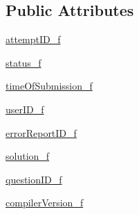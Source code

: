 \subsection*{Public Attributes}
\begin{DoxyCompactItemize}
\item 
\hyperlink{class_ecodena_1_1_attempt_1_1models_1_1_attempt_a5868c5092dc59689fe48af770ea41bc5}{attemptID\_\-f}
\item 
\hyperlink{class_ecodena_1_1_attempt_1_1models_1_1_attempt_aa0e8d9e10aa7d394777a8dcc138b67bf}{status\_\-f}
\item 
\hyperlink{class_ecodena_1_1_attempt_1_1models_1_1_attempt_a4cf15d230e30719df408282601d157fa}{timeOfSubmission\_\-f}
\item 
\hyperlink{class_ecodena_1_1_attempt_1_1models_1_1_attempt_ad138a4fd5a48644d71382b83a9ba4a04}{userID\_\-f}
\item 
\hyperlink{class_ecodena_1_1_attempt_1_1models_1_1_attempt_ac1e3f9e2d93bbdd1d339f9331a560926}{errorReportID\_\-f}
\item 
\hyperlink{class_ecodena_1_1_attempt_1_1models_1_1_attempt_a8cadfc3c3993ddedf4f8a49e67b71e19}{solution\_\-f}
\item 
\hyperlink{class_ecodena_1_1_attempt_1_1models_1_1_attempt_a52c7956666bd826ed90d2db15d6f876b}{questionID\_\-f}
\item 
\hyperlink{class_ecodena_1_1_attempt_1_1models_1_1_attempt_a65d3f184f3aa9803c86a6c31f4a2a256}{compilerVersion\_\-f}
\end{DoxyCompactItemize}
